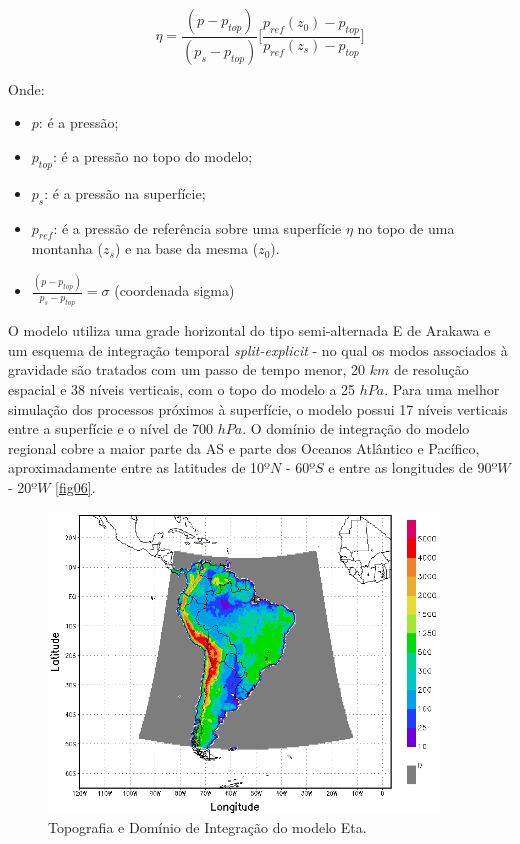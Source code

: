 \begin{equation}
\eta=\frac{(p-p_{top})}{(p_{s}-p_{top})}\bigg[\frac{p_{ref}(z_{0})-p_{top}}{p_{ref}(z_{s})-p_{top}}\bigg]
\label{form04}
\end{equation}

Onde:

\begin{itemize}
\item $p$: é a pressão;
\item $p_{top}$: é a pressão no topo do modelo;
\item $p_{s}$: é a pressão na superfície;
\item $p_{ref}$: é a pressão de referência sobre uma superfície $\eta$ no topo de uma montanha ($z_{s}$) e na base da mesma ($z_{0}$).
\item $\frac{(p-p_{top})}{p_{s}-p_{top}}=\sigma$ (coordenada sigma)
\end{itemize}

O modelo utiliza uma grade horizontal do tipo semi-alternada E de Arakawa \cite{arakawalamb77} e um esquema de integração temporal \textit{split-explicit} - no qual os modos associados à gravidade são tratados com um passo de tempo menor, 20 $km$ de resolução espacial e 38 níveis verticais, com o topo do modelo a 25 $hPa$. Para uma melhor simulação dos processos próximos à superfície, o modelo possui 17 níveis verticais entre a superfície e o nível de 700 $hPa$. O domínio de integração do modelo regional cobre a maior parte da AS e parte dos Oceanos Atlântico e Pacífico, aproximadamente entre as latitudes de 10$ºN$ - 60$ºS$ e entre as longitudes de 90$ºW$ - 20$ºW$ \autoref{fig06}.

\begin{figure}[!h]
\centering
\includegraphics[height=8cm]{./figs/topo_dom.png}
\caption{Topografia e Domínio de Integração do modelo Eta.}
\label{fig06}
\end{figure}

